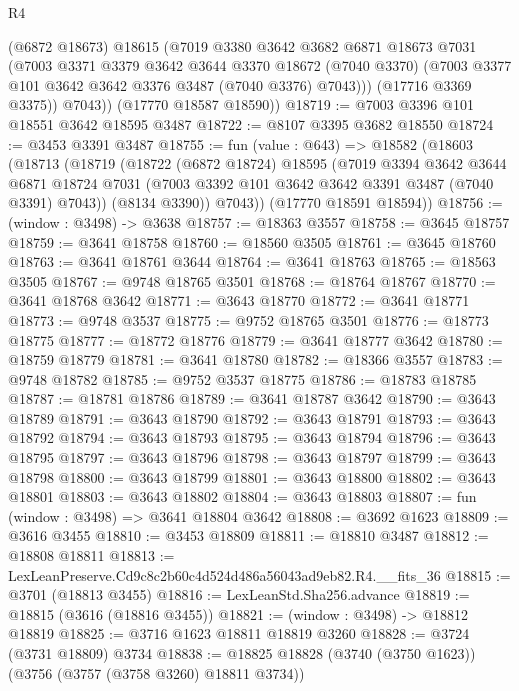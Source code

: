 \begin{lexlean}{R4}
\begin{coremodule}
            (@6872 @18673)
            @18615
            (@7019
              @3380
              @3642
              @3682
              @6871
              @18673
              @7031
              (@7003
                @3371
                @3379
                @3642
                @3644
                @3370
                @18672
                (@7040 @3370)
                (@7003 @3377 @101 @3642 @3642 @3376 @3487 (@7040 @3376) @7043)))
            (@17716 @3369 @3375))
          @7043))
      (@17770 @18587 @18590))
@18719 := @7003 @3396 @101 @18551 @3642 @18595 @3487
@18722 := @8107 @3395 @3682 @18550
@18724 := @3453 @3391 @3487
@18755 := fun (value : @643) =>
  @18582
    (@18603
      (@18713
        (@18719
          (@18722
            (@6872 @18724)
            @18595
            (@7019
              @3394
              @3642
              @3644
              @6871
              @18724
              @7031
              (@7003 @3392 @101 @3642 @3642 @3391 @3487 (@7040 @3391) @7043))
            (@8134 @3390))
          @7043))
      (@17770 @18591 @18594))
@18756 := (window : @3498) -> @3638
@18757 := @18363 @3557
@18758 := @3645 @18757
@18759 := @3641 @18758
@18760 := @18560 @3505
@18761 := @3645 @18760
@18763 := @3641 @18761 @3644
@18764 := @3641 @18763
@18765 := @18563 @3505
@18767 := @9748 @18765 @3501
@18768 := @18764 @18767
@18770 := @3641 @18768 @3642
@18771 := @3643 @18770
@18772 := @3641 @18771
@18773 := @9748 @3537
@18775 := @9752 @18765 @3501
@18776 := @18773 @18775
@18777 := @18772 @18776
@18779 := @3641 @18777 @3642
@18780 := @18759 @18779
@18781 := @3641 @18780
@18782 := @18366 @3557
@18783 := @9748 @18782
@18785 := @9752 @3537 @18775
@18786 := @18783 @18785
@18787 := @18781 @18786
@18789 := @3641 @18787 @3642
@18790 := @3643 @18789
@18791 := @3643 @18790
@18792 := @3643 @18791
@18793 := @3643 @18792
@18794 := @3643 @18793
@18795 := @3643 @18794
@18796 := @3643 @18795
@18797 := @3643 @18796
@18798 := @3643 @18797
@18799 := @3643 @18798
@18800 := @3643 @18799
@18801 := @3643 @18800
@18802 := @3643 @18801
@18803 := @3643 @18802
@18804 := @3643 @18803
@18807 := fun (window : @3498) => @3641 @18804 @3642
@18808 := @3692 @1623
@18809 := @3616 @3455
@18810 := @3453 @18809
@18811 := @18810 @3487
@18812 := @18808 @18811
@18813 := LexLeanPreserve.Cd9c8c2b60c4d524d486a56043ad9eb82.R4.__fits_36
@18815 := @3701 (@18813 @3455)
@18816 := LexLeanStd.Sha256.advance
@18819 := @18815 (@3616 (@18816 @3455))
@18821 := (window : @3498) -> @18812 @18819
@18825 := @3716 @1623 @18811 @18819 @3260
@18828 := @3724 (@3731 @18809) @3734
@18838 := @18825 @18828 (@3740 (@3750 @1623)) (@3756 (@3757 (@3758 @3260) @18811 @3734))

\end{coremodule}
\end{lexlean}
